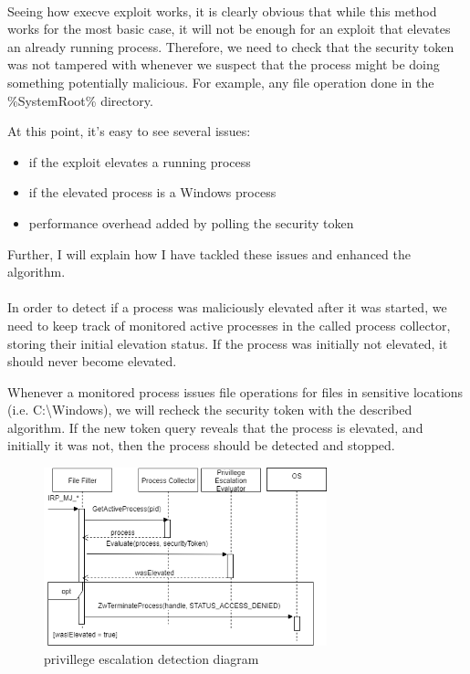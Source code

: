         \paragraph{}
        Seeing how execve exploit works, it is clearly obvious that while this method works for the most basic case, it will not be enough for an
        exploit that elevates an already running process. Therefore, we need to check that the security token was not tampered with whenever we
        suspect that the process might be doing something potentially malicious. For example, any file operation done in the \%SystemRoot\%
        directory.

        At this point, it's easy to see several issues:\\

        \begin{itemize}
            \item if the exploit elevates a running process
            \item if the elevated process is a Windows process
            \item performance overhead added by polling the security token
        \end{itemize}

        Further, I will explain how I have tackled these issues and enhanced the algorithm.

        \paragraph{}
        In order to detect if a process was maliciously elevated after it was started, we need to keep track of monitored active processes in the
        called process collector, storing their initial elevation status. If the process was initially not elevated, it should never become
        elevated.

        Whenever a monitored process issues file operations for files in sensitive locations (i.e. C:\textbackslash Windows), we will recheck
        the security token with the described algorithm. If the new token query reveals that the process is elevated, and initially it was not,
        then the process should be detected and stopped.

        \pagebreak

        \begin{figure}[!ht]
            \centering
            \includegraphics[width=310px,keepaspectratio]{img/privilege_escalation_detection_diagram.png}
            \caption{privillege escalation detection diagram}
            \label{fig:privilege_escalation_detection_diagram}
        \end{figure}

